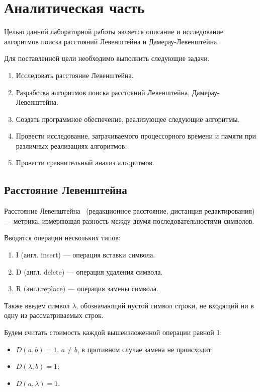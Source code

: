\chapter{Аналитическая часть}

Целью данной лабораторной работы является описание и исследование алгоритмов поиска расстояний Левенштейна и Дамерау-Левенштейна.


Для поставленной цели необходимо выполнить следующие задачи.
\begin{enumerate}[label={\arabic*)}]
	\item Исследовать расстояние Левенштейна.
	\item Разработка алгоритмов поиска расстояний Левенштейна, Дамерау-Левенштейна.
	\item Создать программное обеспечение, реализующее следующие алгоритмы.
	\item Провести исследование, затрачиваемого процессорного времени и памяти при различных реализациях алгоритмов.
	\item Провести сравнительный анализ алгоритмов.
\end{enumerate}

\section{Расстояние Левенштейна}


Расстояние Левенштейна~\cite{levenshtein} (редакционное расстояние, дистанция редактирования) --- метрика, измеряющая разность между двумя последовательностями символов.

Вводятся операции нескольких типов:
\begin{enumerate}[label=\arabic*]
	\item I (англ. insert) --- операция вставки символа.
	\item D (англ. delete) --- операция удаления символа.
	\item R (англ.replace) --- операция замены символа.
\end{enumerate}
Также введем символ $\lambda$, обозначающий пустой символ строки, не входящий ни в одну из рассматриваемых строк.

Будем считать стоимость каждой вышеизложенной операции равной 1:
\begin{itemize}[label=---]
	\item $D(a, b) = 1$, $a \neq b$, в противном случае замена не происходит;
	\item $D(\lambda, b) = 1$;
	\item $D(a, \lambda) = 1$.
\end{itemize}



